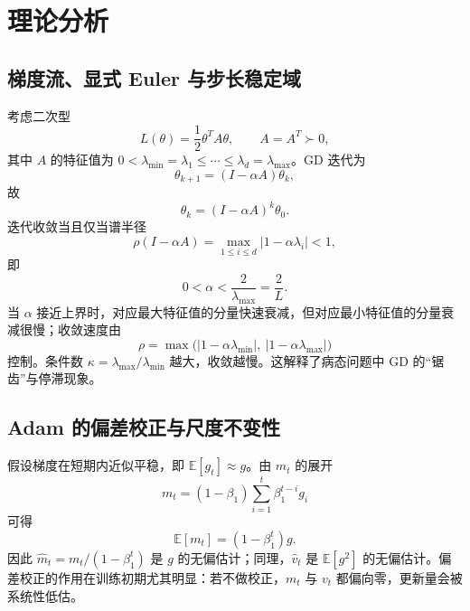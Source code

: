 \documentclass[12pt,a4paper]{ctexart}
\begin{document}
\section{理论分析}

\subsection{梯度流、显式 Euler 与步长稳定域}
考虑二次型
\begin{equation}
L(\theta)=\frac12\theta^T A\theta,\qquad A=A^T\succ0,
\end{equation}
其中 $A$ 的特征值为 $0<\lambda_{\min}=\lambda_1\le\cdots\le\lambda_d=\lambda_{\max}$。GD 迭代为
\begin{equation}
\theta_{k+1}=(I-\alpha A)\theta_k,
\end{equation}
故
\begin{equation}
\theta_k=(I-\alpha A)^k\theta_0.
\end{equation}
迭代收敛当且仅当谱半径
\begin{equation}
\rho(I-\alpha A)=\max_{1\le i\le d}|1-\alpha\lambda_i|<1,
\end{equation}
即
\begin{equation}
0<\alpha<\frac{2}{\lambda_{\max}}=\frac{2}{L}.
\label{eq:stability}
\end{equation}
当 $\alpha$ 接近上界时，对应最大特征值的分量快速衰减，但对应最小特征值的分量衰减很慢；收敛速度由
\begin{equation}
\rho=\max\bigl(|1-\alpha\lambda_{\min}|,\ |1-\alpha\lambda_{\max}|\bigr)
\end{equation}
控制。条件数 $\kappa=\lambda_{\max}/\lambda_{\min}$ 越大，收敛越慢。这解释了病态问题中 GD 的“锯齿”与停滞现象。

\subsection{Adam 的偏差校正与尺度不变性}
假设梯度在短期内近似平稳，即 $\mathbb E[g_t]\approx g$。由 $m_t$ 的展开
\begin{equation}
m_t=(1-\beta_1)\sum_{i=1}^{t}\beta_1^{t-i}g_i
\end{equation}
可得
\begin{equation}
\mathbb E[m_t]=(1-\beta_1^t)g.
\end{equation}
因此 $\hat m_t=m_t/(1-\beta_1^t)$ 是 $g$ 的无偏估计；同理，$\hat v_t$ 是 $\mathbb E[g^2]$ 的无偏估计。偏差校正的作用在训练初期尤其明显：若不做校正，$m_t$ 与 $v_t$ 都偏向零，更新量会被系统性低估。
\end{document}

